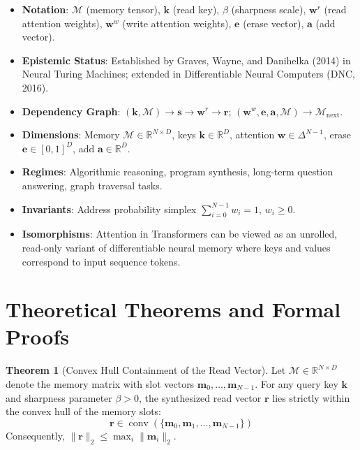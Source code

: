 \documentclass[11pt,a4paper]{article}
\theoremstyle{definition}
\newtheorem{theorem}{\textbf{Theorem}}[section]
\begin{document}
\begin{itemize}
    \item \textbf{Notation}: $\mathcal{M}$ (memory tensor), $\mathbf{k}$ (read key), $\beta$ (sharpness scale), $\mathbf{w}^r$ (read attention weights), $\mathbf{w}^w$ (write attention weights), $\mathbf{e}$ (erase vector), $\mathbf{a}$ (add vector).
    \item \textbf{Epistemic Status}: Established by Graves, Wayne, and Danihelka (2014) in Neural Turing Machines; extended in Differentiable Neural Computers (DNC, 2016).
    \item \textbf{Dependency Graph}: $(\mathbf{k}, \mathcal{M}) \to \mathbf{s} \to \mathbf{w}^r \to \mathbf{r}$; $(\mathbf{w}^w, \mathbf{e}, \mathbf{a}, \mathcal{M}) \to \mathcal{M}_{\text{next}}$.
    \item \textbf{Dimensions}: Memory $\mathcal{M} \in \mathbb{R}^{N \times D}$, keys $\mathbf{k} \in \mathbb{R}^D$, attention $\mathbf{w} \in \Delta^{N-1}$, erase $\mathbf{e} \in [0, 1]^D$, add $\mathbf{a} \in \mathbb{R}^D$.
    \item \textbf{Regimes}: Algorithmic reasoning, program synthesis, long-term question answering, graph traversal tasks.
    \item \textbf{Invariants}: Address probability simplex $\sum_{i=0}^{N-1} w_i = 1$, $w_i \ge 0$.
    \item \textbf{Isomorphisms}: Attention in Transformers can be viewed as an unrolled, read-only variant of differentiable neural memory where keys and values correspond to input sequence tokens.
\end{itemize}

\section{Theoretical Theorems and Formal Proofs}

\begin{theorem}[Convex Hull Containment of the Read Vector]
Let $\mathcal{M} \in \mathbb{R}^{N \times D}$ denote the memory matrix with slot vectors $\mathbf{m}_0, \dots, \mathbf{m}_{N-1}$. For any query key $\mathbf{k}$ and sharpness parameter $\beta > 0$, the synthesized read vector $\mathbf{r}$ lies strictly within the convex hull of the memory slots:
{\boldmath
\begin{equation}
\mathbf{r} \in \operatorname{conv}(\{\mathbf{m}_0, \mathbf{m}_1, \dots, \mathbf{m}_{N-1}\})
\end{equation}
}
Consequently, $\|\mathbf{r}\|_2 \le \max_{i} \|\mathbf{m}_i\|_2$.
\end{theorem}
\end{document}
